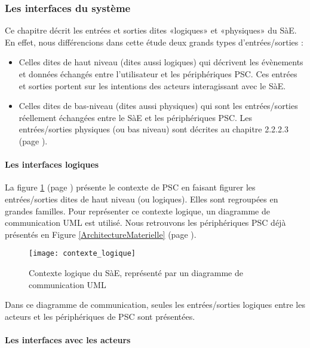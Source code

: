 \subsubsection{Les interfaces du système}

Ce chapitre décrit les entrées et sorties dites «logiques» et «physiques» du SàE. 
En effet, nous différencions dans cette étude deux grands types d’entrées/sorties :
\begin{itemize}
    \item Celles dites de haut niveau (dites aussi logiques) qui décrivent les évènements et données échangés entre l’utilisateur et les périphériques PSC. 
    Ces entrées et sorties portent sur les intentions des acteurs interagissant avec le SàE.
    \item Celles dites de bas-niveau (dites aussi physiques) qui sont les entrées/sorties réellement échangées entre le SàE et les périphériques PSC. 
    Les entrées/sorties physiques (ou bas niveau) sont décrites au chapitre 2.2.2.3 (page \pageref{2.2.2.3}).
\end{itemize}

\newpage

\paragraph{Les interfaces logiques}

La figure \ref{ContexteLogique} (page \pageref{ContexteLogique}) présente le contexte de PSC en faisant figurer les entrées/sorties dites de haut niveau (ou logiques). 
Elles sont regroupées en grandes familles. 
Pour représenter ce contexte logique, un diagramme de communication UML est utilisé. 
Nous retrouvons les périphériques PSC déjà présentés en Figure \ref{ArchitectureMaterielle} (page \pageref{ArchitectureMaterielle}).

\begin{figure} [H]
    \centering
    \texttt{[image: contexte\_logique]}
    \caption{Contexte logique du SàE, représenté par un diagramme de communication UML}
    \label{ContexteLogique}
\end{figure}

Dans ce diagramme de communication, seules les entrées/sorties logiques entre les acteurs et les périphériques de PSC sont présentées.

\paragraph{Les interfaces avec les acteurs}

